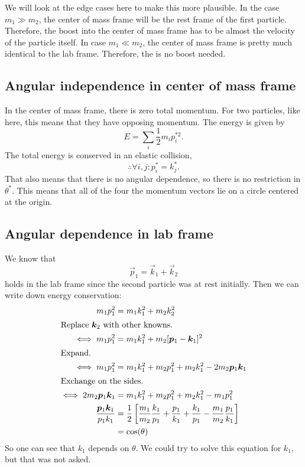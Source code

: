 \documentclass[11pt, english, fleqn, DIV=15, headinclude, BCOR=1.5cm]{scrartcl}
\begin{document}
We will look at the edge cases here to make this more plausible. In the case
$m_1 \gg m_2$, the center of mass frame will be the rest frame of the first
particle. Therefore, the boost into the center of mass frame has to be almost
the velocity of the particle itself. In case $m_1 \ll m_2$, the center of mass
frame is pretty much identical to the lab frame. Therefore, the is no boost
needed.

\subsection{Angular independence in center of mass frame}

In the center of mass frame, there is zero total momentum. For two particles,
like here, this means that they have opposing momentum. The energy is given by
\[
    E = \sum_i \frac 12 m_i p_i^{*2}.
\]
The total energy is conserved in an elastic collision,
\[
    \therefore \forall i, j\colon p_i^* = k_j^*.
\]
That also means that there is no angular dependence, so there is no restriction
in $\theta^*$. This means that all of the four the momentum vectors lie on a
circle centered at the origin.

\subsection{Angular dependence in lab frame}

We know that
\[
    \vec p_1 = \vec k_1 + \vec k_2
\]
holds in the lab frame since the second particle was at rest initially. Then we
can write down energy conservation:
\begin{align*}
    m_1 p_1^2 &= m_1 k_1^2 + m_2 k_2^2 \\
    \intertext{%
        Replace $\vec k_2$ with other knowns.
    }
    \iff m_1 p_1^2 &= m_1 k_1^2 + m_2 [\vec p_1 - \vec k_1]^2 \\
    \intertext{%
        Expand.
    }
    \iff m_1 p_1^2 &= m_1 k_1^2 + m_2 p_1^2 + m_2 k_1^2 - 2 m_2 \vec p_1 \vec k_1 \\
    \intertext{%
        Exchange on the sides.
    }
    \iff 2 m_2 \vec p_1 \vec k_1 &= m_1 k_1^2 + m_2 p_1^2 + m_2 k_1^2 - m_1 p_1^2  \\
    \frac{\vec p_1 \vec k_1}{p_1 k_1} &= \frac 12 \sbr{
        \frac{m_1}{m_2} \frac{k_1}{p_1} + \frac{p_1}{k_1} + \frac{k_1}{p_1} -
        \frac{m_1}{m_2} \frac{p_1}{k_1}
    } \\
    &= \cos(\theta)
\end{align*}
So one can see that $k_1$ depends on $\theta$. We could try to solve this
equation for $k_1$, but that was not asked.
\end{document}
